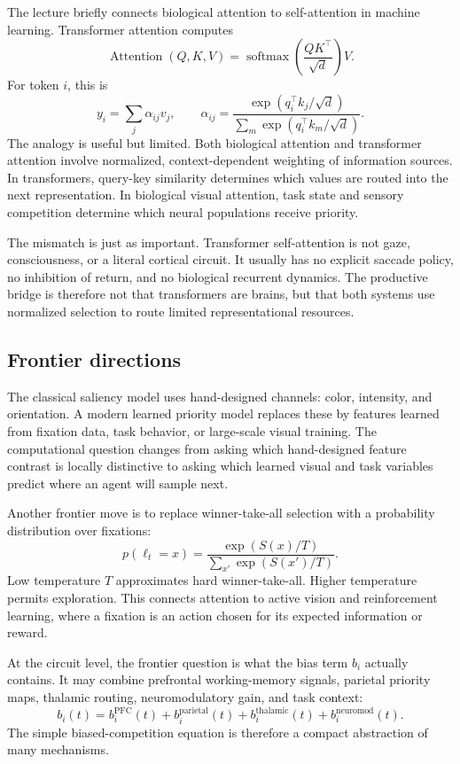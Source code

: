 The lecture briefly connects biological attention to self-attention in machine learning. Transformer attention computes
\[
\operatorname{Attention}(Q,K,V)
=
\operatorname{softmax}\!\left(\frac{QK^\top}{\sqrt d}\right)V.
\]
For token \(i\), this is
\[
y_i
=
\sum_j \alpha_{ij}v_j,
\qquad
\alpha_{ij}
=
\frac{\exp(q_i^\top k_j/\sqrt d)}
{\sum_m \exp(q_i^\top k_m/\sqrt d)}.
\]
The analogy is useful but limited. Both biological attention and transformer attention involve normalized, context-dependent weighting of information sources. In transformers, query-key similarity determines which values are routed into the next representation. In biological visual attention, task state and sensory competition determine which neural populations receive priority.

The mismatch is just as important. Transformer self-attention is not gaze, consciousness, or a literal cortical circuit. It usually has no explicit saccade policy, no inhibition of return, and no biological recurrent dynamics. The productive bridge is therefore not that transformers are brains, but that both systems use normalized selection to route limited representational resources.

\subsection{Frontier directions}

The classical saliency model uses hand-designed channels: color, intensity, and orientation. A modern learned priority model replaces these by features learned from fixation data, task behavior, or large-scale visual training. The computational question changes from asking which hand-designed feature contrast is locally distinctive to asking which learned visual and task variables predict where an agent will sample next.

Another frontier move is to replace winner-take-all selection with a probability distribution over fixations:
\[
p(\ell_t=x)
=
\frac{\exp(S(x)/T)}
{\sum_{x'}\exp(S(x')/T)}.
\]
Low temperature \(T\) approximates hard winner-take-all. Higher temperature permits exploration. This connects attention to active vision and reinforcement learning, where a fixation is an action chosen for its expected information or reward.

At the circuit level, the frontier question is what the bias term \(b_i\) actually contains. It may combine prefrontal working-memory signals, parietal priority maps, thalamic routing, neuromodulatory gain, and task context:
\[
b_i(t)
=
b_i^{\mathrm{PFC}}(t)
+
b_i^{\mathrm{parietal}}(t)
+
b_i^{\mathrm{thalamic}}(t)
+
b_i^{\mathrm{neuromod}}(t).
\]
The simple biased-competition equation is therefore a compact abstraction of many mechanisms.

